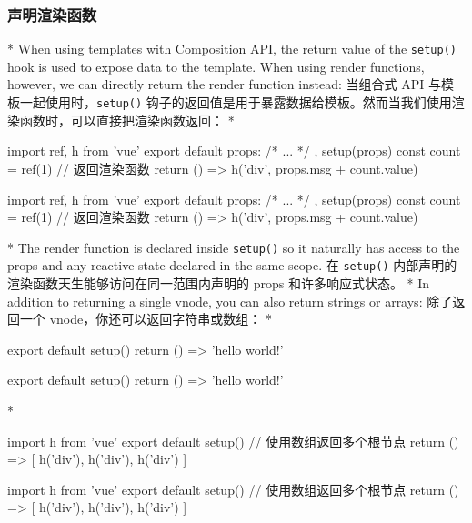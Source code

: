 \begin{paracol}{2}
\subsubsection{声明渲染函数}
\switchcolumn[0]*%
When using templates with Composition API, the return value of the
\texttt{setup()} hook is used to expose data to the template. When using
render functions, however, we can directly return the render function
instead:
\switchcolumn
当组合式 API 与模板一起使用时，\texttt{setup()}
钩子的返回值是用于暴露数据给模板。然而当我们使用渲染函数时，可以直接把渲染函数返回：
\switchcolumn[0]*%
\begin{codeJs}
import { ref, h } from 'vue'
export default {
  props: {
    /* ... */
  },
  setup(props) {
    const count = ref(1)
    // 返回渲染函数
    return () => h('div', props.msg + count.value)
  }
}
\end{codeJs}
\switchcolumn
\begin{codeJs}
import { ref, h } from 'vue'
export default {
  props: {
    /* ... */
  },
  setup(props) {
    const count = ref(1)
    // 返回渲染函数
    return () => h('div', props.msg + count.value)
  }
}
\end{codeJs}
\switchcolumn[0]*%
The render function is declared inside \texttt{setup()} so it naturally
has access to the props and any reactive state declared in the same
scope.
\switchcolumn
在 \texttt{setup()} 内部声明的渲染函数天生能够访问在同一范围内声明的
props 和许多响应式状态。
\switchcolumn[0]*%
In addition to returning a single vnode, you can also return strings or
arrays:
\switchcolumn
除了返回一个 vnode，你还可以返回字符串或数组：
\switchcolumn[0]*%
\begin{codeJs}
export default {
  setup() {
    return () => 'hello world!'
  }
}
\end{codeJs}
\switchcolumn
\begin{codeJs}
export default {
  setup() {
    return () => 'hello world!'
  }
}
\end{codeJs}
\switchcolumn[0]*%
\begin{codeJs}
import { h } from 'vue'
export default {
  setup() {
    // 使用数组返回多个根节点
    return () => [
      h('div'),
      h('div'),
      h('div')
    ]
  }
}
\end{codeJs}
\switchcolumn
\begin{codeJs}
import { h } from 'vue'
export default {
  setup() {
    // 使用数组返回多个根节点
    return () => [
      h('div'),
      h('div'),
      h('div')
    ]
  }
}
\end{codeJs}

\end{paracol}
